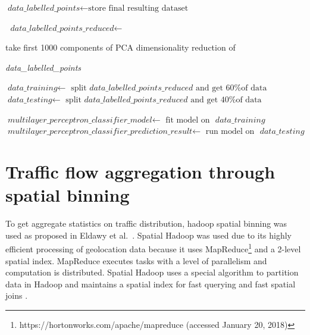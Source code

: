 \documentclass[12pt, a4paper]{report}
\theoremstyle{definition}
\theoremstyle{definition}%
\theoremstyle{definition}%
\theoremstyle{definition}%
\theoremstyle{definition}%
\theoremstyle{definition}%
\begin{document}
\begin{algorithm} [hpt]
\begin{algorithmic}[1]
			\State $\textit{data\_labelled\_points} \gets \text{store final resulting dataset}$
			
			\State $\textit{ data\_labelled\_points\_reduced} \gets$ \par 
					take first 1000 components of PCA dimensionality reduction of \par 
					\textit{ data\_labelled\_points}
			
			\State $\textit{data\_training} 	\gets$  $ \text{split } \textit{data\_labelled\_points\_reduced} \text{ and get 60\% of data }$
			\State $\textit{data\_testing} 	    \gets$  $ \text{split } \textit{data\_labelled\_points\_reduced} \text{ and get 40\% of data }$
			
			\State $\textit{multilayer\_perceptron\_classifier\_model} 	\gets$  $\text{fit model on } \textit{ data\_training}$	
			\State $\textit{multilayer\_perceptron\_classifier\_prediction\_result} 	\gets$  $\text{run model on } \textit{ data\_testing}$	
			\State {}
					
			
		\EndIndent 			

	\end{algorithmic}
\end{algorithm}




\section{Traffic flow aggregation through spatial binning} \label{section:spatial_binning}

To get aggregate statistics on traffic distribution, hadoop spatial binning was used as proposed in Eldawy et al.\ \cite{eldawy2015spatialhadoop}. Spatial Hadoop was used due to its highly efficient processing of geolocation data because it uses MapReduce\footnote{https://hortonworks.com/apache/mapreduce (accessed January 20, 2018)} and a 2-level spatial index. MapReduce executes tasks with a level of parallelism and computation is distributed. Spatial Hadoop uses a special algorithm to partition data in Hadoop and maintains a spatial index for fast querying and fast spatial joins \cite{eldawy2015spatialhadoop}. 
\end{document}
